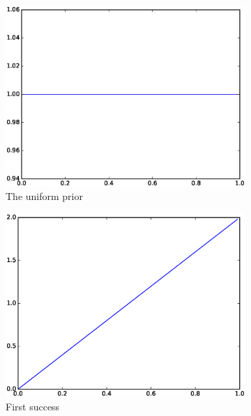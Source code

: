 \documentclass[10pt,a4paper]{article}
\begin{document}
\begin{figure}[h]
  \centering
  \begin{subfigure}[b]{0.23\textwidth}
		\includegraphics[width=\textwidth]{model/beta-learning-1-1}
		\caption{The uniform prior}
	\end{subfigure}
  \begin{subfigure}[b]{0.23\textwidth}
		\includegraphics[width=\textwidth]{model/beta-learning-2-1}
		\caption{First success}
	\end{subfigure}
  \begin{subfigure}[b]{0.23\textwidth}

\end{subfigure}
\end{figure}
\end{document}
